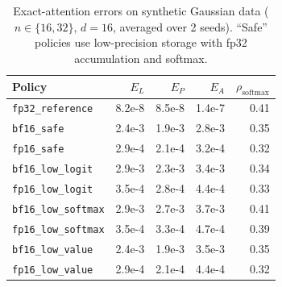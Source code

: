 \begin{table}[ht]
\centering
\caption{Exact-attention errors on synthetic Gaussian data ($n \in \{16, 32\}$, $d = 16$, averaged over 2 seeds). ``Safe'' policies use low-precision storage with fp32 accumulation and softmax.}
\label{tab:gaussian}
\small
\begin{tabular}{l rrr r}
\toprule
Policy & $E_L$ & $E_P$ & $E_A$ & $\rho_{\mathrm{softmax}}$ \\
\midrule
\texttt{fp32\_reference}    & 8.2e-8  & 8.5e-8  & 1.4e-7  & 0.41 \\
\texttt{bf16\_safe}         & 2.4e-3  & 1.9e-3  & 2.8e-3  & 0.35 \\
\texttt{fp16\_safe}         & 2.9e-4  & 2.1e-4  & 3.2e-4  & 0.32 \\
\midrule
\texttt{bf16\_low\_logit}   & 2.9e-3  & 2.3e-3  & 3.4e-3  & 0.34 \\
\texttt{fp16\_low\_logit}   & 3.5e-4  & 2.8e-4  & 4.4e-4  & 0.33 \\
\midrule
\texttt{bf16\_low\_softmax} & 2.9e-3  & 2.7e-3  & 3.7e-3  & 0.41 \\
\texttt{fp16\_low\_softmax} & 3.5e-4  & 3.3e-4  & 4.7e-4  & 0.39 \\
\midrule
\texttt{bf16\_low\_value}   & 2.4e-3  & 1.9e-3  & 3.5e-3  & 0.35 \\
\texttt{fp16\_low\_value}   & 2.9e-4  & 2.1e-4  & 4.4e-4  & 0.32 \\
\bottomrule
\end{tabular}
\end{table}


